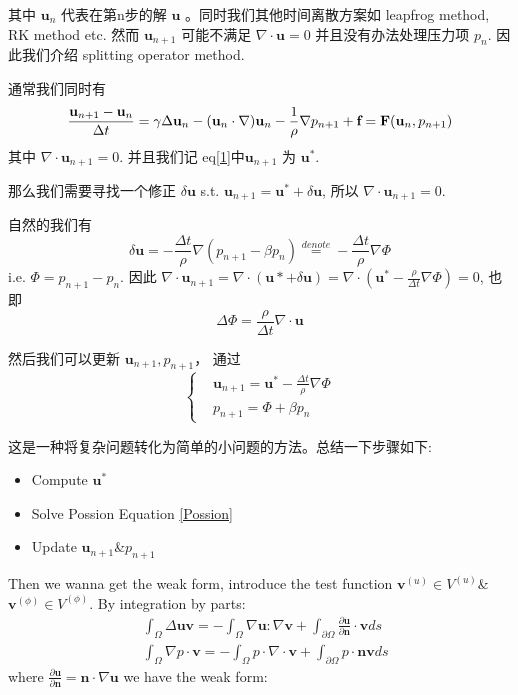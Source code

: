 其中 $\textbf{u}_n$ 代表在第n步的解 $\textbf{u}$ 。同时我们其他时间离散方案如 leapfrog method, RK method etc. 
然而 $\textbf{u}_{n+1}$ 可能不满足 $\nabla \cdot \textbf{u}=0$ 并且没有办法处理压力项 $p_n$. 因此我们介绍 splitting operator method.

通常我们同时有 
\begin{equation}
    \frac{\textbf{u}_{n+1}-\textbf{u}_n}{\Delta t}=\gamma \Delta \textbf{u}_n-(\textbf{u}_n\cdot \nabla) \textbf{u}_n-\frac{1}{\rho}\nabla p_{n+1}+\textbf{f}=\textbf{F}(\textbf{u}_n,p_{n+1})\\
\end{equation}
其中 $\nabla \cdot \textbf{u}_{n+1}=0$. 并且我们记 eq\ref*{1}中$\textbf{u}_{n+1}$  为 $\textbf{u}^*$. 

那么我们需要寻找一个修正 $\delta \textbf{u}$ s.t. $\textbf{u}_{n+1}=\textbf{u}^*+\delta \textbf{u}$, 所以 $\nabla \cdot \textbf{u}_{n+1}=0$.

自然的我们有
 $$\delta \textbf{u}=-\frac{\Delta t}{\rho}\nabla(p_{n+1}-\beta p_n)\stackrel{denote}{=}-\frac{\Delta t}{\rho}\nabla \Phi$$
i.e. $\Phi=p_{n+1}-p_n$. 因此 $\nabla\cdot \textbf{u}_{n+1}=\nabla \cdot(\textbf{u}*+\delta \textbf{u})=\nabla \cdot (\textbf{u}^*-\frac{\rho}{\Delta t}\nabla\Phi)=0$, 
也即
\begin{equation}
    \Delta \Phi = \frac{\rho}{\Delta t}\nabla \cdot \textbf{u}
    \label{Possion}
\end{equation} 

然后我们可以更新 $\textbf{u}_{n+1},p_{n+1}$， 通过 
\begin{equation}\left\{
    \begin{aligned}
        &\textbf{u}_{n+1}=\textbf{u}^*-\frac{\Delta t}{\rho}\nabla \Phi\\
        &p_{n+1}=\Phi + \beta p_n
    \end{aligned}\right.
\end{equation}

这是一种将复杂问题转化为简单的小问题的方法。总结一下步骤如下:
\begin{itemize}
    \item Compute $\textbf{u}^*$
    \item Solve Possion Equation \ref*{Possion}
    \item Update $\textbf{u}_{n+1}$\&$p_{n+1}$
\end{itemize}

Then we wanna get the weak form, introduce the test function $\textbf{v}^{(u)}\in V^{(u)}$\& $\textbf{v}^(\phi)\in V^{(\phi)}$. By integration by parts:
$$\begin{aligned}
    &\int_\Omega\Delta \textbf{u}\textbf{v}=-\int_\Omega\nabla\textbf{u}:\nabla\textbf{v}+\int_{\partial\Omega}\frac{\partial \textbf{u}}{\partial \textbf{n}}\cdot \textbf{v}ds\\
    &\int_\Omega \nabla p\cdot \textbf{v}=-\int_\Omega p\cdot \nabla \cdot \textbf{v}+\int_{\partial \Omega}p\cdot\textbf{n}\textbf{v}ds
\end{aligned}$$where $\frac{\partial \textbf{u}}{\partial \textbf{n}}=\textbf{n}\cdot \nabla \textbf{u}$ we have the weak form:

